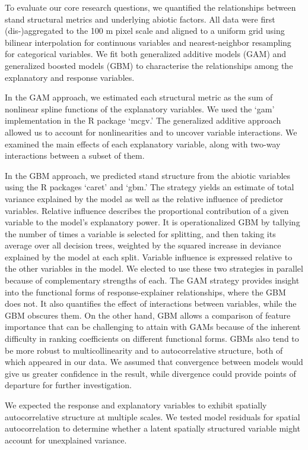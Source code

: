 \documentclass[
  12pt,
]{article}
\begin{document}
To evaluate our core research questions, we quantified the relationships
between stand structural metrics and underlying abiotic factors. All
data were first (dis-)aggregated to the 100 m pixel scale and aligned to
a uniform grid using bilinear interpolation for continuous variables and
nearest-neighbor resampling for categorical variables. We fit both
generalized additive models (GAM) and generalized boosted models (GBM)
to characterise the relationships among the explanatory and response
variables.

In the GAM approach, we estimated each structural metric as the sum of
nonlinear spline functions of the explanatory variables. We used the
`gam' implementation in the R package `mcgv.' The generalized additive
approach allowed us to account for nonlinearities and to uncover
variable interactions. We examined the main effects of each explanatory
variable, along with two-way interactions between a subset of them.

In the GBM approach, we predicted stand structure from the abiotic
variables using the R packages `caret' and `gbm.' The strategy yields an
estimate of total variance explained by the model as well as the
relative influence of predictor variables. Relative influence describes
the proportional contribution of a given variable to the model's
explanatory power. It is operationalized GBM by tallying the number of
times a variable is selected for splitting, and then taking its average
over all decision trees, weighted by the squared increase in deviance
explained by the model at each split. Variable influence is expressed
relative to the other variables in the model. We elected to use these
two strategies in parallel because of complementary strengths of each.
The GAM strategy provides insight into the functional forms of
response-explainer relationships, where the GBM does not. It also
quantifies the effect of interactions between variables, while the GBM
obscures them. On the other hand, GBM allows a comparison of feature
importance that can be challenging to attain with GAMs because of the
inherent difficulty in ranking coefficients on different functional
forms. GBMs also tend to be more robust to multicollinearity and to
autocorrelative structure, both of which appeared in our data. We
assumed that convergence between models would give us greater confidence
in the result, while divergence could provide points of departure for
further investigation.

We expected the response and explanatory variables to exhibit spatially
autocorrelative structure at multiple scales. We tested model residuals
for spatial autocorrelation to determine whether a latent spatially
structured variable might account for unexplained variance.
\end{document}
